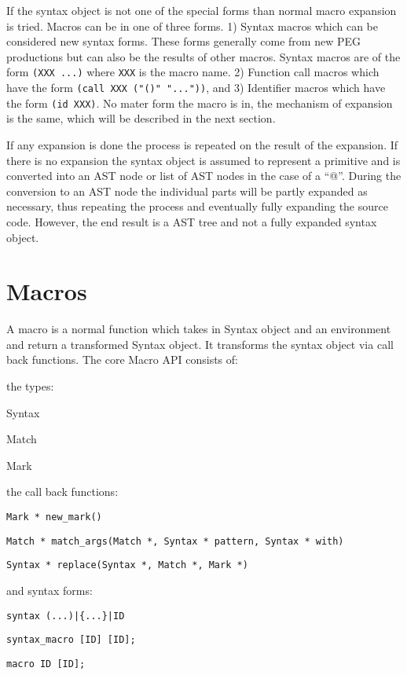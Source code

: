 \documentclass[12pt,english,letterpaper]{article}
\begin{document}
If the syntax object is not one of the special forms than normal macro
expansion is tried.  Macros can be in one of three forms. 1) Syntax
macros which can be considered new syntax forms.  These forms
generally come from new PEG productions but can also be the results of
other macros.  Syntax macros are of the form \verb/(XXX ...)/ where
\verb/XXX/ is the macro name.  2) Function call macros which have the
form \verb/(call XXX ("()" "..."))/, and 3) Identifier macros which
have the form \verb/(id XXX)/.  No mater form the macro is in, the
mechanism of expansion is the same, which will be described in the
next section.

If any expansion is done the process is repeated on the result of the
expansion.  If there is no expansion the syntax object is assumed to
represent a primitive and is converted into an AST node or list of AST
nodes in the case of a ``@''.  During the conversion to an AST node
the individual parts will be partly expanded as necessary, thus
repeating the process and eventually fully expanding the source code.
However, the end result is a AST tree and not a fully expanded syntax
object.

\section{Macros}

A macro is a normal function which takes in Syntax object and an
environment and return a transformed Syntax object.  It transforms the
syntax object via call back functions.  The core Macro API consists of:
\begin{itemize*}
\item the types:
\begin{itemize*}
\item Syntax 
\item Match
\item Mark
\end{itemize*}
\item the call back functions:
\begin{itemize*}
\item \verb/Mark * new_mark()/
\item \verb/Match * match_args(Match *, Syntax * pattern, Syntax * with)/
\item \verb/Syntax * replace(Syntax *, Match *, Mark *)/
\end{itemize*}
\item and syntax forms:
\begin{itemize*}
\item \verb/syntax (...)|{...}|ID/
\item \verb/syntax_macro [ID] [ID];/
\item \verb/macro ID [ID];/
\end{itemize*}
\end{itemize*}
\end{document}
